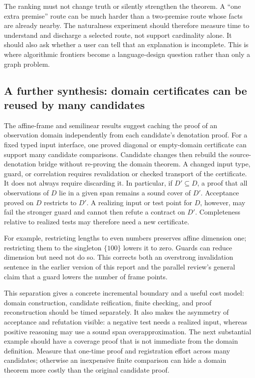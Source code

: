 \documentclass[11pt,letterpaper]{article}
\theoremstyle{definition}\newtheorem{definition}[proposition]{Definition}
\theoremstyle{remark}\newtheorem{remark}[proposition]{Remark}
\begin{document}
The ranking must not change truth or silently strengthen the theorem. A
``one extra premise'' route can be much harder than a two-premise route whose
facts are already nearby. The naturalness experiment should therefore measure
time to understand and discharge a selected route, not support cardinality
alone. It should also ask whether a user can tell that an explanation is
incomplete. This is where algorithmic frontiers become a language-design
question rather than only a graph problem.

\subsection{A further synthesis: domain certificates can be reused by many candidates}

The affine-frame and semilinear results suggest caching the proof of an
observation domain independently from each candidate's denotation proof.
For a fixed typed input interface, one proved diagonal or empty-domain
certificate can support many candidate comparisons. Candidate changes then
rebuild the source-denotation bridge without re-proving the domain theorem.
A changed input type, guard, or correlation requires revalidation or checked
transport of the certificate. It does not always require discarding it.
In particular, if $D'\subseteq D$, a proof that all observations of $D$ lie
in a given span remains a sound cover of $D'$. Acceptance proved on $D$
restricts to $D'$. A realizing input or test point for $D$, however, may fail
the stronger guard and cannot then refute a contract on $D'$. Completeness
relative to realized tests may therefore need a new certificate.

For example, restricting lengths to even numbers preserves affine dimension
one; restricting them to the singleton $\{100\}$ lowers it to zero. Guards
can reduce dimension but need not do so. This corrects both an overstrong
invalidation sentence in the earlier version of this report and the parallel
review's general claim that a guard lowers the number of frame points.

This separation gives a concrete incremental boundary and a useful cost model:
domain construction, candidate reification, finite checking, and proof
reconstruction should be timed separately. It also makes the asymmetry of
acceptance and refutation visible: a negative test needs a realized input,
whereas positive reasoning may use a sound span overapproximation.
The next substantial example should have a coverage proof that is not immediate
from the domain definition. Measure that one-time proof and registration effort
across many candidates; otherwise an inexpensive finite comparison can hide a
domain theorem more costly than the original candidate proof.
\end{document}
